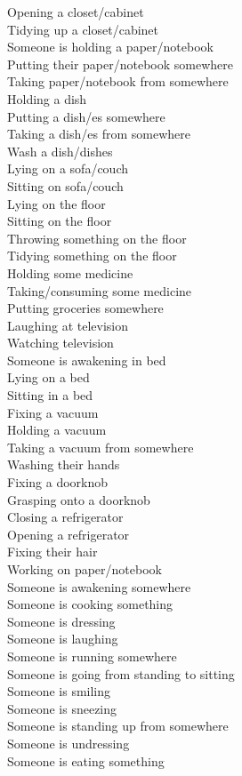 \begin{multicols}{2}
Opening a closet/cabinet \\
Tidying up a closet/cabinet \\
Someone is holding a paper/notebook \\
Putting their paper/notebook somewhere \\
Taking paper/notebook from somewhere \\
Holding a dish \\
Putting a dish/es somewhere \\
Taking a dish/es from somewhere \\
Wash a dish/dishes \\
Lying on a sofa/couch \\
Sitting on sofa/couch \\
Lying on the floor \\
Sitting on the floor \\
Throwing something on the floor \\
Tidying something on the floor \\
Holding some medicine \\
Taking/consuming some medicine \\
Putting groceries somewhere \\
Laughing at television \\
Watching television \\
Someone is awakening in bed \\
Lying on a bed \\
Sitting in a bed \\
Fixing a vacuum \\
Holding a vacuum \\
Taking a vacuum from somewhere \\
Washing their hands \\
Fixing a doorknob \\
Grasping onto a doorknob \\
Closing a refrigerator \\
Opening a refrigerator \\
Fixing their hair \\
Working on paper/notebook \\
Someone is awakening somewhere \\
Someone is cooking something \\
Someone is dressing \\
Someone is laughing \\
Someone is running somewhere \\
Someone is going from standing to sitting \\
Someone is smiling \\
Someone is sneezing \\
Someone is standing up from somewhere \\
Someone is undressing \\
Someone is eating something \\
\end{multicols}
